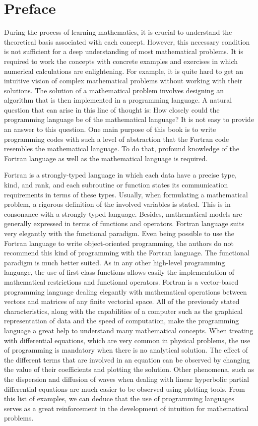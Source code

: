 \chapter*{Preface}
During the process of learning mathematics, it is crucial to understand the theoretical basis associated with each concept. 
However, this necessary condition is not sufficient for a deep understanding of most mathematical problems. 
It is required to work the concepts with concrete examples and exercises in which numerical calculations are enlightening. 
For example, it is quite hard to get an intuitive vision of complex mathematical problems without working with their solutions.
The solution of a mathematical problem involves designing an algorithm that is then implemented in a programming language. 
A natural question that can arise in this line of thought is: How closely could the programming language be of the mathematical language?
It is not easy to provide an answer to this question. 
One main purpose of this book is to write programming codes with such a level of abstraction that the Fortran code resembles the mathematical language.  To do that,  profound knowledge of the Fortran language as well as the mathematical language is required. 


Fortran is a  strongly-typed language in which each data have a precise type, kind, and rank, and each subroutine or function states its communication requirements in terms of these types.
Usually, when formulating a  mathematical problem, a rigorous definition of the involved variables is stated.  This is in consonance with a strongly-typed language.  Besides, mathematical models are generally expressed in terms of functions and operators. Fortran language suits very elegantly with the functional paradigm. 
Even being possible to use the Fortran language to write object-oriented programming, the authors do not recommend this kind of programming with the Fortran language. The functional paradigm is much better suited. 
As in any other high-level programming language, the use of first-class functions allows easily the implementation of mathematical restrictions and functional operators.  Fortran is a vector-based programming language dealing elegantly with mathematical operations between vectors and matrices of any finite vectorial space.
All of the previously stated characteristics, along with the capabilities of a computer such as the graphical representation of data and the speed of computation, make the programming language a great help to understand many mathematical concepts. 
When treating with differential equations, which are very common in physical problems, the use of programming is mandatory when there is no analytical solution. The effect of the different terms that are involved in an equation can be observed by changing the value of their coefficients and plotting the solution. Other phenomena, such as the dispersion and diffusion of waves when dealing with linear hyperbolic partial differential equations are much easier to be observed using plotting tools. From this list of examples, we can deduce that the use of programming languages serves as a great reinforcement in the development of intuition for mathematical problems.


